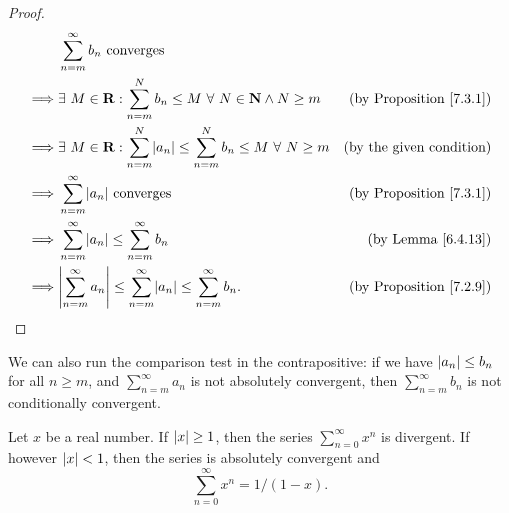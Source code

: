 \begin{proof}
    \begin{align*}
                 & \sum_{n = m}^\infty b_n \text{ converges}                                                                                                      \\
        \implies & \exists\ M \in \mathbf{R} : \sum_{n = m}^N b_n \leq M \ \forall\ N \in \mathbf{N} \land N \geq m         & \text{(by Proposition \ref{7.3.1})} \\
        \implies & \exists\ M \in \mathbf{R} : \sum_{n = m}^N \abs*{a_n} \leq \sum_{n = m}^N b_n \leq M \ \forall\ N \geq m & \text{(by the given condition)}     \\
        \implies & \sum_{n = m}^\infty \abs*{a_n} \text{ converges}                                                         & \text{(by Proposition \ref{7.3.1})} \\
        \implies & \sum_{n = m}^\infty \abs*{a_n} \leq \sum_{n = m}^\infty b_n                                              & \text{(by Lemma \ref{6.4.13})}      \\
        \implies & \abs*{\sum_{n = m}^\infty a_n} \leq \sum_{n = m}^\infty \abs*{a_n} \leq \sum_{n = m}^\infty b_n.         & \text{(by Proposition \ref{7.2.9})}
    \end{align*}
\end{proof}

\begin{note}
    We can also run the comparison test in the contrapositive:
    if we have \(\abs*{a_n} \leq b_n\) for all \(n \geq m\), and \(\sum_{n = m}^\infty a_n\) is not absolutely convergent, then \(\sum_{n = m}^\infty b_n\) is not conditionally convergent.
\end{note}

\begin{lemma}\label{7.3.3}
    Let \(x\) be a real number.
    If \(\abs*{x} \geq 1\), then the series \(\sum_{n = 0}^\infty x^n\) is divergent.
    If however \(\abs*{x} < 1\), then the series is absolutely convergent and
    \[
        \sum_{n = 0}^\infty x^n = 1 / (1 - x).
    \]
\end{lemma}


